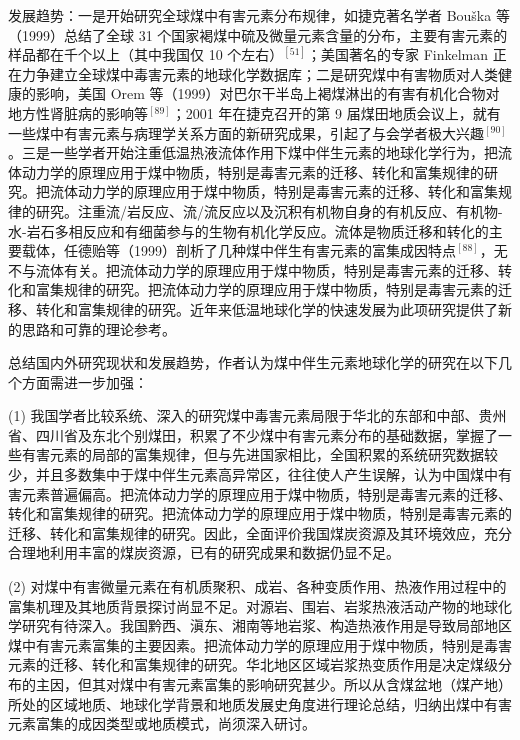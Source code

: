 发展趋势：一是开始研究全球煤中有害元素分布规律，如捷克著名学者 Bouška 等（1999）总结了全球 31 个国家褐煤中硫及微量元素含量的分布，主要有害元素的样品都在千个以上（其中我国仅 10 个左右）$^{[51]}$；美国著名的专家 Finkelman 正在力争建立全球煤中毒害元素的地球化学数据库；二是研究煤中有害物质对人类健康的影响，美国 Orem 等（1999）对巴尔干半岛上褐煤淋出的有害有机化合物对地方性肾脏病的影响等$^{[89]}$；2001 年在捷克召开的第 9 届煤田地质会议上，就有一些煤中有害元素与病理学关系方面的新研究成果，引起了与会学者极大兴趣$^{[90]}$。三是一些学者开始注重低温热液流体作用下煤中伴生元素的地球化学行为，把流体动力学的原理应用于煤中物质，特别是毒害元素的迁移、转化和富集规律的研究。把流体动力学的原理应用于煤中物质，特别是毒害元素的迁移、转化和富集规律的研究。注重流/岩反应、流/流反应以及沉积有机物自身的有机反应、有机物-水-岩石多相反应和有细菌参与的生物有机化学反应。流体是物质迁移和转化的主要载体，任德贻等（1999）剖析了几种煤中伴生有害元素的富集成因特点$^{[88]}$，无不与流体有关。把流体动力学的原理应用于煤中物质，特别是毒害元素的迁移、转化和富集规律的研究。把流体动力学的原理应用于煤中物质，特别是毒害元素的迁移、转化和富集规律的研究。近年来低温地球化学的快速发展为此项研究提供了新的思路和可靠的理论参考。

总结国内外研究现状和发展趋势，作者认为煤中伴生元素地球化学的研究在以下几个方面需进一步加强：

(1) 我国学者比较系统、深入的研究煤中毒害元素局限于华北的东部和中部、贵州省、四川省及东北个别煤田，积累了不少煤中有害元素分布的基础数据，掌握了一些有害元素的局部的富集规律，但与先进国家相比，全国积累的系统研究数据较少，并且多数集中于煤中伴生元素高异常区，往往使人产生误解，认为中国煤中有害元素普遍偏高。把流体动力学的原理应用于煤中物质，特别是毒害元素的迁移、转化和富集规律的研究。把流体动力学的原理应用于煤中物质，特别是毒害元素的迁移、转化和富集规律的研究。因此，全面评价我国煤炭资源及其环境效应，充分合理地利用丰富的煤炭资源，已有的研究成果和数据仍显不足。

(2) 对煤中有害微量元素在有机质聚积、成岩、各种变质作用、热液作用过程中的富集机理及其地质背景探讨尚显不足。对源岩、围岩、岩浆热液活动产物的地球化学研究有待深入。我国黔西、滇东、湘南等地岩浆、构造热液作用是导致局部地区煤中有害元素富集的主要因素。把流体动力学的原理应用于煤中物质，特别是毒害元素的迁移、转化和富集规律的研究。华北地区区域岩浆热变质作用是决定煤级分布的主因，但其对煤中有害元素富集的影响研究甚少。所以从含煤盆地（煤产地）所处的区域地质、地球化学背景和地质发展史角度进行理论总结，归纳出煤中有害元素富集的成因类型或地质模式，尚须深入研讨。

